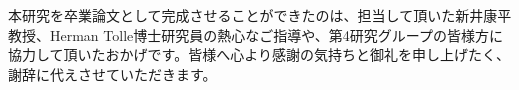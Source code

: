 \begin{acknowledgment}
本研究を卒業論文として完成させることができたのは、担当して頂いた新井康平教授、Herman Tolle博士研究員の熱心なご指導や、第4研究グループの皆様方に協力して頂いたおかげです。皆様へ心より感謝の気持ちと御礼を申し上げたく、謝辞に代えさせていただきます。
\end{acknowledgment}
